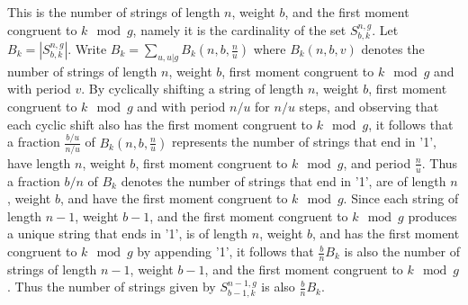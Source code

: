This is  the number of strings of length $n$, weight $b$, and the
first moment congruent to $k \mod g$, namely it is the cardinality
of the set $S_{b,k}^{n,g}$. Let $B_k=|S_{b,k}^{n,g}|$. Write $B_k=
\sum_{u,u|g} B_k(n,b,\frac{n}{u})$ where $B_k(n,b,v)$ denotes the
number of strings of length $n$, weight $b$, first moment congruent
to $k \mod g$ and with period $v$. By cyclically shifting a string
of length $n$, weight $b$, first moment congruent to $k \mod g$ and
with period $n/u$ for $n/u$ steps, and observing that each cyclic
shift also has the first moment congruent to $k \mod g$, it follows
that a fraction $\frac{b/u}{n/u}$ of $B_k(n,b,\frac{n}{u})$
represents the number of strings that end in '1', have length $n$,
weight $b$, first moment congruent to $k \mod g$, and period
$\frac{n}{u}$. Thus a fraction $b/n$ of $B_k$ denotes the number of
strings that end in '1', are of length $n$, weight $b$, and have the
first moment congruent to $k \mod g$. Since each string of length
$n-1$, weight $b-1$, and the first moment congruent to $k \mod g$
produces a unique string that ends in '1', is of length $n$, weight
$b$, and has the first moment congruent to $k \mod g$ by appending
'1', it follows that $\frac{b}{n}B_k$ is also the number of strings
of length $n-1$, weight $b-1$, and the first moment congruent to $k
\mod g$. Thus the number of strings given by $S_{b-1,k}^{n-1,g}$ is
also $\frac{b}{n}B_k$.


